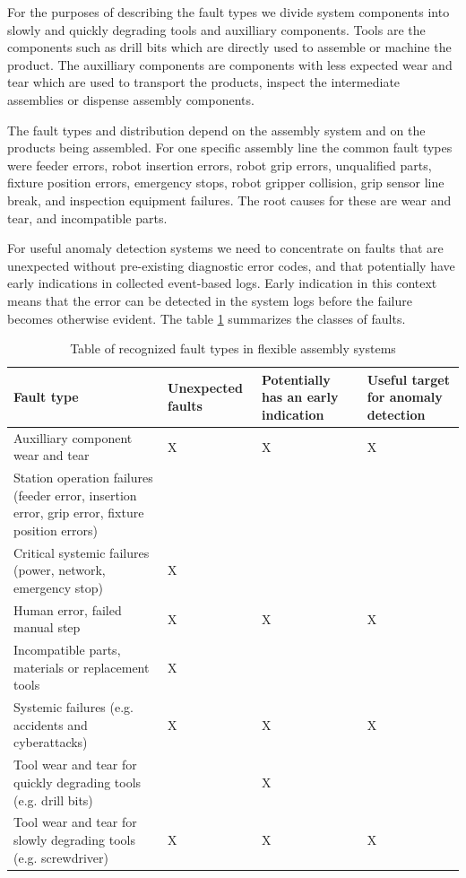 \documentclass[journal]{IEEEtran}
\begin{document}
For the purposes of describing the fault types we divide system components into slowly and
quickly degrading tools and auxilliary components. Tools are the components such as drill bits which are directly used to assemble or
machine the product. The auxilliary components are components with less expected wear and tear which are used to transport the products,
inspect the intermediate assemblies or dispense assembly components.

The fault types and distribution depend on the assembly system
and on the products being assembled. For one
specific assembly line \cite{cong1997fault} the common fault types were feeder errors, robot insertion errors,
robot grip errors, unqualified parts, fixture position errors, emergency stops, robot gripper collision,
grip sensor line break, and inspection equipment failures. The root causes for these are wear and tear, and incompatible parts.

For useful anomaly detection systems we need to concentrate on faults that are unexpected without pre-existing diagnostic error codes, and that potentially have early indications
in collected event-based logs. Early indication in this context means that the error can be detected in the system logs before the failure becomes otherwise evident.
The table \ref{faults} summarizes the classes of faults.

\begin{table}[!t]
\renewcommand{\arraystretch}{1.3}
\caption{Table of recognized fault types in flexible assembly systems}
\label{faults}
\centering
\begin{tabular}{|p{25mm}|p{15mm}|p{15mm}|p{15mm}|}
\hline
Fault type & Unexpected faults & Potentially has an early indication & Useful target for anomaly detection \\
\hline
\hline
Auxilliary component wear and tear & X & X & X \\
\hline
Station operation failures (feeder error, insertion error, grip error, fixture position errors) & & & \\
\hline
Critical systemic failures (power, network, emergency stop) & X & & \\
\hline
Human error, failed manual step & X & X & X \\
\hline
Incompatible parts, materials or replacement tools & X & & \\
\hline
Systemic failures (e.g. accidents and cyberattacks) & X & X & X \\
\hline
Tool wear and tear for quickly degrading tools (e.g. drill bits) & & X & \\
\hline
Tool wear and tear for slowly degrading tools (e.g. screwdriver) & X & X & X \\
\hline
\end{tabular}
\end{table}
\end{document}
